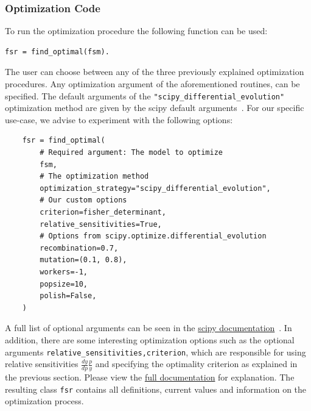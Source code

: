 \documentclass[10pt,A4paper]{article}
\begin{document}
\subsubsection*{Optimization Code}
To run the optimization procedure the following function can be used:
\begin{verbatim}
fsr = find_optimal(fsm).
\end{verbatim}
The user can choose between any of the three previously explained optimization procedures.
Any optimization argument of the aforementioned routines, can be specified.
The default arguments of the \texttt{"scipy_differential_evolution"} optimization method are given by the scipy default arguments~\cite{scipydiffev}.
For our specific use-case, we advise to experiment with the following options:
\begin{verbatim}
    fsr = find_optimal(
        # Required argument: The model to optimize
        fsm,
        # The optimization method
        optimization_strategy="scipy_differential_evolution",
        # Our custom options
        criterion=fisher_determinant,
        relative_sensitivities=True,
        # Options from scipy.optimize.differential_evolution
        recombination=0.7,
        mutation=(0.1, 0.8),
        workers=-1,
        popsize=10,
        polish=False,
    )
\end{verbatim}
A full list of optional arguments can be seen in the \href{https://docs.scipy.org/doc/scipy/reference/optimize.html#global-optimization}{scipy documentation}~\cite{virtanenSciPyFundamentalAlgorithms2020}.
In addition, there are some interesting optimization options such as the optional arguments \texttt{relative_sensitivities,criterion}, which are responsible for using relative sensitivities $\tfrac{dy}{dp}\tfrac{p}{y}$ and specifying the optimality criterion as explained in the previous section.
Please view the \href{https://spatial-systems-biology-freiburg.github.io/FisInMa/}{full documentation} for explanation.
The resulting class \texttt{fsr} contains all definitions, current values and information on the optimization process.
%
\end{document}
